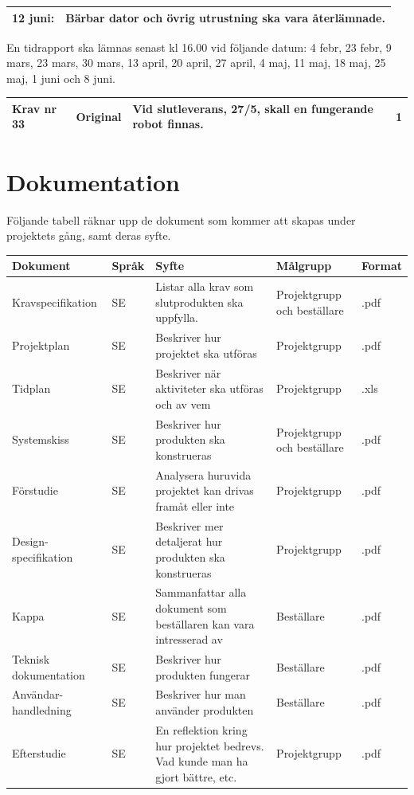 \documentclass[11pt]{article}
\begin{document}
\begin{flushleft}
\begin{center}
\begin{longtable}{|l |p{.8\linewidth}|}
12 juni: &
Bärbar dator och övrig utrustning ska vara återlämnade. \\ \hline
\end{longtable}
\end{center}
En tidrapport ska lämnas senast kl 16.00 vid följande datum: 4 febr, 23 febr, 9 mars, 23 mars, 30 mars, 13 april, 20 april, 27 april, 4 maj, 11 maj, 18 maj, 25 maj, 1 juni och 8 juni.

\begin{center}
\begin{longtable}{|l|l|p{.70\linewidth}|l|} \hline

Krav nr 33 &
Original &
Vid slutleverans, 27/5, skall en fungerande robot finnas. &
1 \\ \hline

\end{longtable}
\end{center}


\pagebreak

\section{Dokumentation}
Följande tabell räknar upp de dokument som kommer att skapas under projektets gång, samt deras syfte.
\begin{center}
\begin{longtable}{|p{.24\linewidth}|p{.08\linewidth}|p{.25\linewidth}|p{.19\linewidth}|p{.1\linewidth}|}\hline
\textbf{Dokument} & \textbf{Språk} & \textbf{Syfte} & \textbf{Målgrupp} & \textbf{Format} \\ \hline

Kravspecifikation & SE & Listar alla krav som slutprodukten ska uppfylla. & Projektgrupp och beställare & .pdf \\ \hline
Projektplan & SE & Beskriver hur projektet ska utföras & Projektgrupp & .pdf \\ \hline
Tidplan & SE & Beskriver när aktiviteter ska utföras och av vem & Projektgrupp & .xls \\ \hline
Systemskiss & SE & Beskriver hur produkten ska konstrueras& Projektgrupp och beställare & .pdf \\ \hline
Förstudie & SE & Analysera huruvida projektet kan drivas framåt eller inte & Projektgrupp & .pdf \\ \hline
Design-specifikation & SE & Beskriver mer detaljerat hur produkten ska konstrueras & Projektgrupp & .pdf \\ \hline
Kappa & SE & Sammanfattar alla dokument som beställaren kan vara intresserad av & Beställare & .pdf \\ \hline
Teknisk dokumentation & SE & Beskriver hur produkten fungerar & Beställare & .pdf \\ \hline
Användar-handledning & SE & Beskriver hur man använder produkten& Beställare & .pdf \\ \hline
Efterstudie & SE & En reflektion kring hur projektet bedrevs. Vad kunde man ha gjort bättre, etc.& Projektgrupp & .pdf \\ \hline


\end{longtable}
\end{center}
\end{flushleft}
\end{document}
